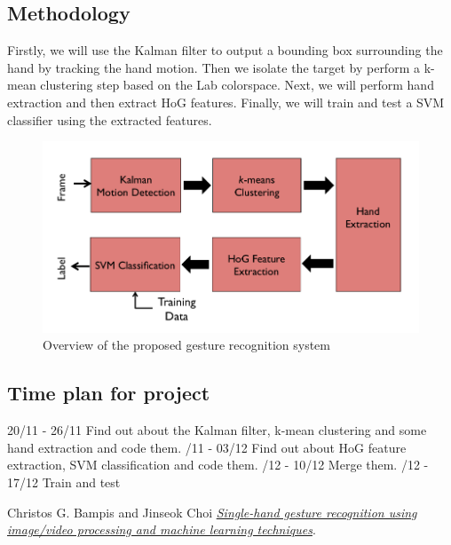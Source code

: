 \documentclass[a4paper, 12pt]{article}
\begin{document}
\subsection{Methodology}
Firstly, we will use the Kalman filter to output a bounding box surrounding the hand by tracking the hand motion. Then we isolate the target by perform a k-mean clustering step based on the Lab colorspace. Next, we will perform hand extraction and then extract HoG features. Finally, we will train and test a SVM classifier using the extracted features.
\begin{figure}[!ht]
\includegraphics[width=\textwidth]{overview.png}
\caption{Overview of the proposed gesture recognition system}
\label{fig:foo}
\end{figure}

\subsection{Time plan for project}
20/11 - 26/11 Find out about the Kalman filter, k-mean clustering and some hand extraction and code them. /11 - 03/12 Find out about HoG feature extraction, SVM classification and code them. /12 - 10/12 Merge them. /12 - 17/12 Train and test \newline


\begin{thebibliography}{1}
Christos G. Bampis and Jinseok Choi
\textit{\href{http://christosbampis.info/wp-content/uploads/2015/05/DigVidProject_2015.pdf}{Single-hand gesture recognition using image/video processing and machine learning techniques}}.
\end{thebibliography}
\end{document}
